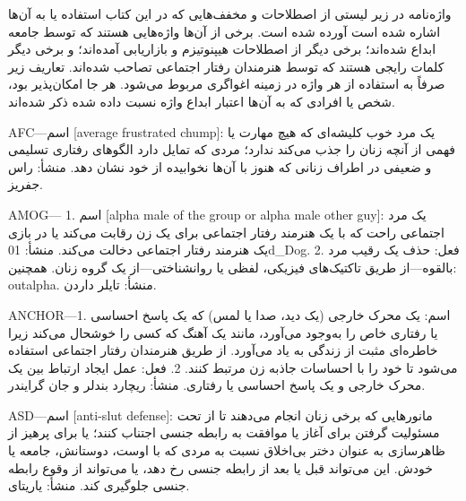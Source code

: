 واژه‌نامه
در زیر لیستی از اصطلاحات و مخفف‌هایی که در این کتاب استفاده یا به آن‌ها اشاره شده است آورده شده است. برخی از آن‌ها واژه‌هایی هستند که توسط جامعه ابداع شده‌اند؛ برخی دیگر از اصطلاحات هیپنوتیزم و بازاریابی آمده‌اند؛ و برخی دیگر کلمات رایجی هستند که توسط هنرمندان رفتار اجتماعی تصاحب شده‌اند. تعاریف زیر صرفاً به استفاده از هر واژه در زمینه اغواگری مربوط می‌شود. هر جا امکان‌پذیر بود، شخص یا افرادی که به آن‌ها اعتبار ابداع واژه نسبت داده شده ذکر شده‌اند.

AFC—اسم [average frustrated chump]: یک مرد خوب کلیشه‌ای که هیچ مهارت یا فهمی از آنچه زنان را جذب می‌کند ندارد؛ مردی که تمایل دارد الگوهای رفتاری تسلیمی و ضعیفی در اطراف زنانی که هنوز با آن‌ها نخوابیده از خود نشان دهد. منشأ: راس جفریز.

AMOG— 1. اسم [alpha male of the group or alpha male other guy]: یک مرد اجتماعی راحت که با یک هنرمند رفتار اجتماعی برای یک زن رقابت می‌کند یا در بازی یک هنرمند رفتار اجتماعی دخالت می‌کند. منشأ: 01d_Dog. 2. فعل: حذف یک رقیب مرد بالقوه—از طریق تاکتیک‌های فیزیکی، لفظی یا روانشناختی—از یک گروه زنان. همچنین: outalpha. منشأ: تایلر داردن.

ANCHOR—1. اسم: یک محرک خارجی (یک دید، صدا یا لمس) که یک پاسخ احساسی یا رفتاری خاص را به‌وجود می‌آورد، مانند یک آهنگ که کسی را خوشحال می‌کند زیرا خاطره‌ای مثبت از زندگی به یاد می‌آورد. از طریق هنرمندان رفتار اجتماعی استفاده می‌شود تا خود را با احساسات جاذبه زن مرتبط کنند. 2. فعل: عمل ایجاد ارتباط بین یک محرک خارجی و یک پاسخ احساسی یا رفتاری. منشأ: ریچارد بندلر و جان گرایندر.

ASD—اسم [anti-slut defense]: مانورهایی که برخی زنان انجام می‌دهند تا از تحت مسئولیت گرفتن برای آغاز یا موافقت به رابطه جنسی اجتناب کنند؛ یا برای پرهیز از ظاهرسازی به عنوان دختر بی‌اخلاق نسبت به مردی که با اوست، دوستانش، جامعه یا خودش. این می‌تواند قبل یا بعد از رابطه جنسی رخ دهد، یا می‌تواند از وقوع رابطه جنسی جلوگیری کند. منشأ: یاریتای.